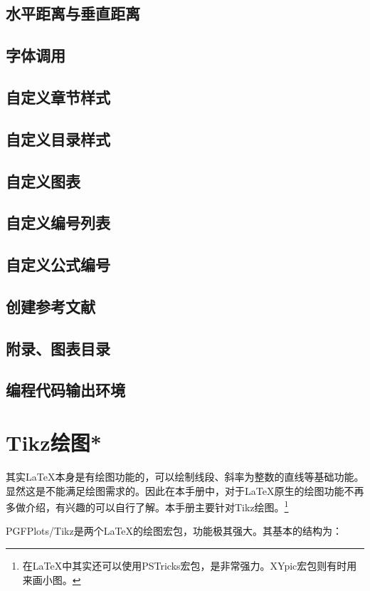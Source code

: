 {\section{水平距离与垂直距离}
\label{sec:hvspace}
\section{字体调用}
\section{自定义章节样式}
\section{自定义目录样式}
\section{自定义图表}
\section{自定义编号列表}
\section{自定义公式编号}
\section{创建参考文献}
\label{sec:bibtex}
\section{附录、图表目录}
\section{编程代码输出环境}

\chapter{Tikz绘图*}
其实\LaTeX 本身是有绘图功能的，可以绘制线段、斜率为整数的直线等基础功能。显然这是不能满足绘图需求的。因此在本手册中，对于\LaTeX{}原生的绘图功能不再多做介绍，有兴趣的可以自行了解。本手册主要针对Tikz绘图。\footnote{在\LaTeX 中其实还可以使用PSTricks宏包，是非常强力。XYpic宏包则有时用来画小图。}

PGFPlots/Tikz是两个\LaTeX{}的绘图宏包，功能极其强大。其基本的结构为：
}
